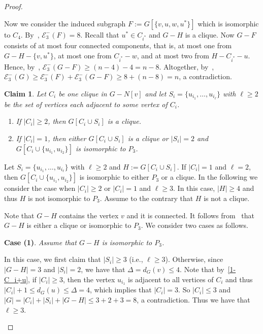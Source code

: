 \documentclass[a4paper,12pt]{article}
\theoremstyle{plain}
\newtheorem{claim}{Claim}[section]
\newenvironment{proof*}{\noindent \emph{Proof of the claim.}}{\hfill$\Diamond$}
\begin{document}
\begin{proof}
\begin{proof*}
Now we consider the induced subgraph $F:=G[\{v,u,w,u^*\}]$ which is isomorphic to $C_4$. By~, $\mathcal{E}_3^{-}(F)=8$. Recall that $u^*\in C_{i^*}$ and $G-H$ is a clique. Now $G-F$ consists of at most four connected components, that is, at most one from $G-H-\{v,u^*\}$, at most one from $C_{i^*}-w$, and at most two from $H-C_{i^*}-u$. Hence, by~, $\mathcal{E}_3^{-}(G-F)\geq (n-4)-4=n-8$. Altogether, by~, $\mathcal{E}_3^{-}(G)\geq\mathcal{E}_3^{-}(F)+\mathcal{E}_3^{-}(G-F)\geq 8+(n-8)=n$, a contradiction.
\end{proof*}



\begin{claim}\label{claim:Si+Ci}
Let $C_i$ be one clique in $G-N[v]$ and let $S_i=\{u_{i_1}, \ldots, u_{i_\ell}\}$ with $\ell\geq 2$ be the set of vertices each adjacent to some vertex of $C_i$. 
\begin{enumerate}[label=(\arabic*)]
\setlength{\itemsep}{0em}
    \item\label{1-C_i+S_i} If $|C_i|\geq 2$, then $G[C_i\cup S_i]$ is a clique.
    \item\label{2-C_i+S_i} If $|C_i|=1$, then either $G[C_i\cup S_i]$ is a clique or $|S_i|=2$ and $G[C_i\cup \{u_{i_1}, u_{i_2}\}]$ is isomorphic to $P_3$.
\end{enumerate}
\end{claim}


\begin{proof*}
Let $S_i=\{u_{i_1}, \ldots, u_{i_\ell}\}$ with $\ell\geq 2$ and $H:=G[C_i \cup S_i]$. 
If $|C_i|=1$ and $\ell=2$, then $G[C_i\cup \{u_{i_1}, u_{i_2}\}]$ is isomorphic to either $P_3$ or a clique. In the following we consider the case when $|C_i|\geq 2$ or $|C_i|=1$ and $\ell\geq 3$. In this case, $|H|\geq 4$ and thus $H$ is not isomorphic to $P_3$. Assume to the contrary that $H$ is not a clique. 


Note that $G-H$ contains the vertex $v$ and it is connected. It follows from~ that $G-H$ is either a clique or isomorphic to $P_3$. We consider two cases as follows.


\smallskip
\noindent
\textbf{Case (1)}. \emph{Assume that $G-H$ is isomorphic to $P_3$.} 
\smallskip

In this case, we first claim that $|S_i|\geq 3$ (i.e., $\ell\geq 3$). Otherwise, since $|G-H|=3$ and $|S_i|=2$, we have that $\Delta=d_G(v)\leq 4$. Note that by~\ref{1-C_i+u}, if $|C_i|\geq 3$, then the vertex $u_{i_1}$ is adjacent to all vertices of $C_i$ and thus $|C_i|+1\leq d_G(u)\leq \Delta=4$, which implies that $|C_i|=3$. So $|C_i|\leq 3$ and $|G|= |C_i|+|S_i|+|G-H|\leq 3+2+3=8$, a contradiction. Thus we have that $\ell\geq 3$. 


\end{proof*}
\end{proof}
\end{document}
